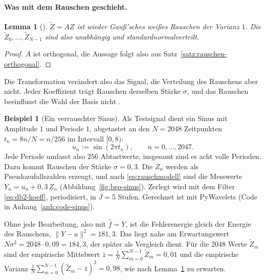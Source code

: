 \documentclass[a4paper,11pt,bibliography=totoc,listof=totoc,headinclude=true,cleardoublepage=empty,oneside]{scrbook}
\theoremstyle{plain}
\newtheorem{Lemma}[Satz]{Lemma}
\theoremstyle{definition}
\newtheorem{Beispiel}[Satz]{Beispiel}
\newcommand{\norm}[1]{\lVert #1 \rVert}
\begin{document}
\paragraph{Was mit dem Rauschen geschieht.}
 
\begin{Lemma}[{\cite[Kap.~11.2.1--11.2.2]{mallat}}] %
\label{lem:rauschen-invariant}
$\tilde Z = AZ$ ist wieder Gau\ss'sches wei\ss es Rauschen der Varianz $1$. Die
$\tilde Z_0,\dots,\tilde Z_{N-1}$ sind also unabhängig und standardnormalverteilt.
\end{Lemma}
 
\begin{proof}
$A$ ist orthogonal, die Aussage folgt also aus
Satz~\ref{satz:rauschen-orthogonal}.
\end{proof}
 
Die Transformation verändert also das Signal, die Verteilung des Rauschens
aber nicht. Jeder Koeffizient trägt Rauschen derselben Stärke $\sigma$, und das
Rauschen beeinflusst die Wahl der Basis nicht \cite[Kap.~11.2.1]{mallat}. %
 
\begin{Beispiel}[Ein verrauschter Sinus]
\label{bsp:sinus}
Als Testsignal dient ein Sinus mit Amplitude $1$ und Periode $1$, abgetastet an
den $N = 2048$ Zeitpunkten $t_n = 8n/N = n/256$ im Intervall $[0,8)$:
\[
  u_n := \sin(2\pi t_n), \qquad n = 0,\dots,2047 .
\]
Jede Periode umfasst also $256$ Abtastwerte, insgesamt sind es acht volle
Perioden. Dazu kommt Rauschen der Stärke $\sigma = 0{,}3$. Die $Z_n$ werden als
Pseudozufallszahlen erzeugt, und nach \eqref{eq:rauschmodell} sind die
Messwerte $Y_n = u_n + 0{,}3\,Z_n$ (Abbildung~\ref{fig:bsp-sinus}). Zerlegt wird
mit dem Filter \eqref{eq:db2-koeff}, periodisiert, in $J = 5$ Stufen. Gerechnet
ist mit PyWavelets \cite{pywavelets} (Code in Anhang~\ref{anh:code-sinus}).
 
Ohne jede Bearbeitung, also mit $\hat f = Y$, ist die Fehlerenergie gleich der
Energie des Rauschens, $\norm{Y-u}^2 = 181{,}3$. Das liegt nahe am
Erwartungswert $N\sigma^2 = 2048\cdot0{,}09 = 184{,}3$, der später als
Vergleich dient. Für die $2048$ Werte $\tilde Z_m$ sind der empirische
Mittelwert $\bar z = \frac1N\sum_{m=0}^{N-1}\tilde Z_m = 0{,}01$ und die
empirische Varianz $\frac1N\sum_{m=0}^{N-1}(\tilde Z_m-\bar z)^2 = 0{,}98$, wie
nach Lemma~\ref{lem:rauschen-invariant} zu erwarten.
\end{Beispiel}
 
\end{document}
